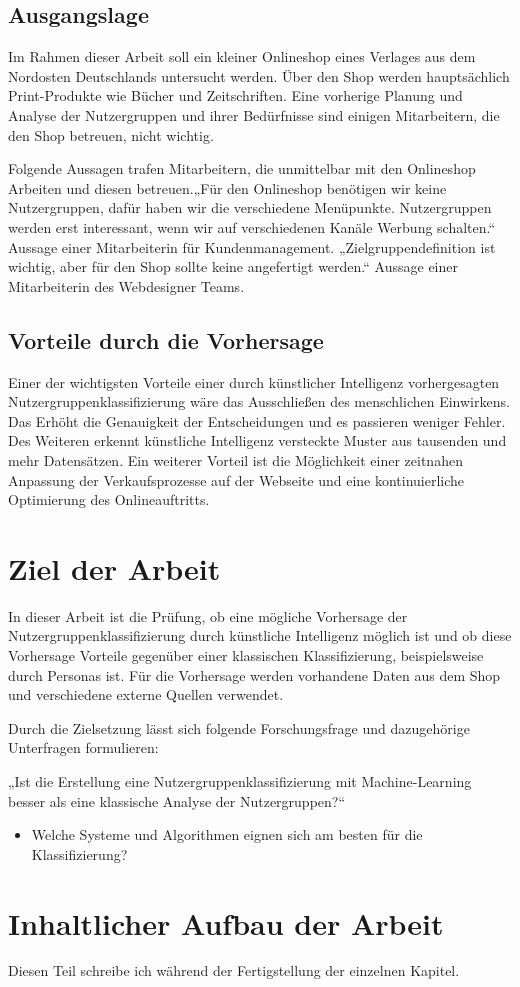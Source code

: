 \subsection{Ausgangslage}
Im Rahmen dieser Arbeit soll ein kleiner Onlineshop eines Verlages aus dem Nordosten Deutschlands untersucht werden. Über den Shop werden hauptsächlich Print-Produkte wie Bücher und Zeitschriften. Eine vorherige Planung und Analyse der Nutzergruppen und ihrer Bedürfnisse sind einigen Mitarbeitern, die den Shop betreuen, nicht wichtig.\vspace{0.2cm}

Folgende Aussagen trafen Mitarbeitern, die unmittelbar mit den Onlineshop Arbeiten und diesen betreuen.„Für den Onlineshop benötigen wir keine Nutzergruppen, dafür haben wir die verschiedene Menüpunkte. Nutzergruppen werden erst interessant, wenn wir auf verschiedenen Kanäle Werbung schalten.“ Aussage einer Mitarbeiterin für Kundenmanagement. „Zielgruppendefinition ist wichtig, aber für den Shop sollte keine angefertigt werden.“ Aussage einer Mitarbeiterin des Webdesigner Teams.
\subsection{Vorteile durch die Vorhersage}
Einer der wichtigsten Vorteile einer durch künstlicher Intelligenz vorhergesagten Nutzergruppenklassifizierung wäre das Ausschließen des menschlichen Einwirkens. Das Erhöht die Genauigkeit der Entscheidungen und es passieren weniger Fehler. Des Weiteren erkennt künstliche Intelligenz versteckte Muster aus tausenden und mehr Datensätzen. Ein weiterer Vorteil ist die Möglichkeit einer zeitnahen Anpassung der Verkaufsprozesse auf der Webseite und eine kontinuierliche Optimierung des Onlineauftritts.
\section{Ziel der Arbeit}
In dieser Arbeit ist die Prüfung, ob eine mögliche Vorhersage der Nutzergruppenklassifizierung durch künstliche Intelligenz möglich ist und ob diese Vorhersage Vorteile gegenüber einer klassischen Klassifizierung, beispielsweise durch Personas ist. Für die Vorhersage werden vorhandene Daten aus dem Shop und verschiedene externe Quellen verwendet.\vspace{0.2cm}

Durch die Zielsetzung lässt sich folgende Forschungsfrage und dazugehörige Unterfragen formulieren:\vspace{0.2cm}

„Ist die Erstellung eine Nutzergruppenklassifizierung mit Machine-Learning besser als eine klassische Analyse der Nutzergruppen?“

\begin{itemize}
	\item Welche Systeme und Algorithmen eignen sich am besten für die Klassifizierung?
\end{itemize}
\section{Inhaltlicher Aufbau der Arbeit}
Diesen Teil schreibe ich während der Fertigstellung der einzelnen Kapitel.
